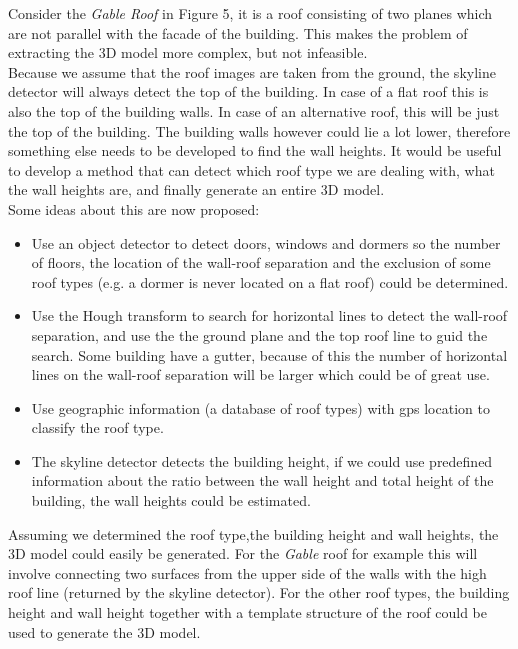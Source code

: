 \documentclass[10pt]{article}
\begin{document}
Consider the \emph{Gable Roof} in Figure 5, it is a roof consisting of two planes
which are not parallel with the facade of the building. This makes the problem
of extracting the 3D model more complex, but not infeasible. \\
Because we assume that the roof images are taken from the ground, the skyline
detector will always detect the top of the building. In case of a flat roof
this is also the top of the building walls. In case of an
alternative roof, this will be just the top of the building. The building walls however
could lie a lot lower, therefore something else needs to be developed to find the wall
heights. It would be useful to develop a method that can detect which roof type we
are dealing with, what the wall heights are, and finally generate an entire 3D
model.\\
Some ideas about this are now proposed:\\
\begin{itemize}
	\item Use an object detector to detect doors, windows and dormers so the 
	number of floors, the location of the wall-roof separation and the exclusion of
	some roof types (e.g. a dormer is never located on a flat roof) could be determined.\\
	\item Use the Hough transform to search for horizontal lines to detect the
	wall-roof separation, and use the the ground plane and the top roof line to
	guid the search.  Some building have a gutter, because of this the number
	of horizontal lines on the wall-roof separation will be larger which could
	be of great use.\\
	\item Use geographic information (a database of roof types) with gps location
	to classify the roof type. \\
	\item The skyline detector detects the building height, if we
	could use predefined information about the ratio between the wall height and
	total height of the building, the wall heights could be estimated.\\
\end{itemize}
Assuming we determined the roof type,the building height and wall heights, the 3D model could 
easily be generated. For the \emph{Gable} roof for example this will involve
connecting two surfaces from the upper side of the walls with the high roof line (returned by the
skyline detector). For the other roof types, the building height and wall
height together with a template structure of the roof could be used to generate the 3D
model.
\end{document}
